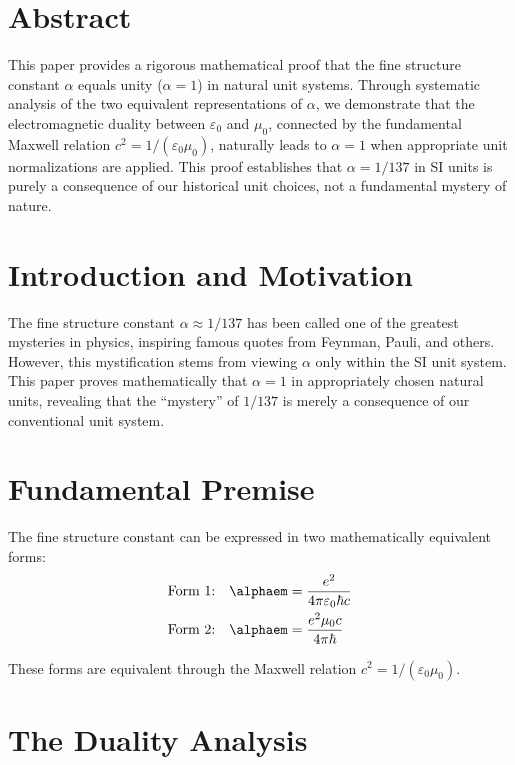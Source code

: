 \section*{Abstract}
		This paper provides a rigorous mathematical proof that the fine structure constant $\alpha$ equals unity ($\alpha = 1$) in natural unit systems. Through systematic analysis of the two equivalent representations of $\alpha$, we demonstrate that the electromagnetic duality between $\varepsilon_0$ and $\mu_0$, connected by the fundamental Maxwell relation $c^2 = 1/(\varepsilon_0\mu_0)$, naturally leads to $\alpha = 1$ when appropriate unit normalizations are applied. This proof establishes that $\alpha = 1/137$ in SI units is purely a consequence of our historical unit choices, not a fundamental mystery of nature.

	
	
	
	\section{Introduction and Motivation}
	
	The fine structure constant $\alpha \approx 1/137$ has been called one of the greatest mysteries in physics, inspiring famous quotes from Feynman, Pauli, and others. However, this mystification stems from viewing $\alpha$ only within the SI unit system. This paper proves mathematically that $\alpha = 1$ in appropriately chosen natural units, revealing that the ``mystery'' of $1/137$ is merely a consequence of our conventional unit system.
	
	\section{Fundamental Premise}
	
	\begin{definition}
		The fine structure constant can be expressed in two mathematically equivalent forms:
		\begin{align}
			\text{Form 1:} \quad \alphaem &= \frac{e^2}{4\pi\varepsilon_0\hbar c} \label{eq:alpha_form1}\\
			\text{Form 2:} \quad \alphaem &= \frac{e^2 \mu_0 c}{4\pi \hbar} \label{eq:alpha_form2}
		\end{align}
	\end{definition}
	
	These forms are equivalent through the Maxwell relation $c^2 = 1/(\varepsilon_0\mu_0)$.
	
	\section{The Duality Analysis}
	
